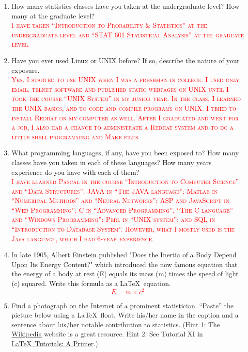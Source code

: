 \documentclass[12pt]{article}
\newcommand{\fillin}[1]{\textcolor{red}{\textsc{#1}}}
\begin{document}
\begin{enumerate}
\item How many statistics classes have you taken at the undergraduate level?  How many at the graduate level?\\
\fillin{I have taken ``Introduction to Probability \& Statistics'' at the undergraduate level and ``STAT 601 Statistical Analysis'' at the graduate level.}
\item Have you ever used Linux or UNIX before?  If so, describe the nature of your exposure.\\
\fillin{Yes. I started to use UNIX when I was a freshman in college. I used only email, telnet software and published static webpages on UNIX until I took the course ``UNIX System'' in my junior year. In the class, I learned the UNIX basics, and to code and compile programs on UNIX. I tried to install Redhat on my computer as well. After I graduated and went for a job, I also had a chance to administrate a Redhat system and to do a little shell programming and Make files.}
\item What programming languages, if any, have you been exposed to?  How many classes have you taken in each of these languages?  How many years experience do you have with each of them?\\
\fillin{I have learned Pascal in the course ``Introduction to Computer Science'' and ``Data Structures''; JAVA in ``The JAVA language''; Matlab in ``Numerical Methods'' and ``Neural Networks''; ASP and JavaScript in ``Web Programming''; C in ``Advanced Programming'', ``The C language'' and ``Windows Programming''; Perl in ``UNIX system''; and SQL in ``Introduction to Database System''. However, what I mostly used is the Java language, which I had 6-year experience.}
\item In late 1905, Albert Einstein published "Does the Inertia of a Body Depend Upon Its Energy Content?" which introduced the now famous equation that the energy of a body at rest (E) equals its mass (m) times the speed of light (c) squared.  Write this formula as a \LaTeX\ equation.\\
\fillin{\begin{equation}E = m \times c^{2}\end{equation}}
\item Find a photograph on the Internet of a prominent statistician.  ``Paste'' the picture below using a \LaTeX\ float.  Write his/her name in the caption and a sentence about his/her notable contribution to statistics.  (Hint 1:  The \href{http://wikipedia.org}{Wikipedia} website is a great resource.  Hint 2:  See Tutorial XI in \href{http://www.stat.tamu.edu/~dahl/teaching/604/lecture/l02/ltxprimer.pdf}{\LaTeX\ Tutorials: A Primer}.)\\

\end{enumerate}
\end{document}
